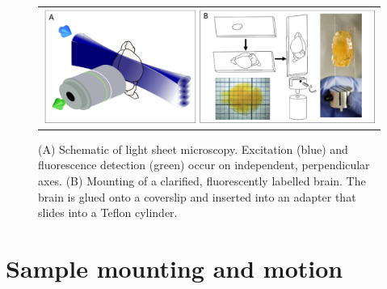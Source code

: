 \documentclass[12pt]{spieman}  %
\begin{document}
\begin{figure}
   \begin{center}
   \begin{tabular}{c}
   \includegraphics[width=\textwidth]{PanelSampel.eps}
   \end{tabular}
   \end{center}
   \caption{\label{fig:Panel0} (A) Schematic of light sheet microscopy. Excitation (blue) and fluorescence detection (green) occur on independent, perpendicular axes. (B) Mounting of a clarified, fluorescently labelled brain. The brain is glued onto a coverslip and inserted into an adapter that slides into a Teflon cylinder.} 
   \end{figure}



\section{Sample mounting and motion}
%
		
\end{document}
